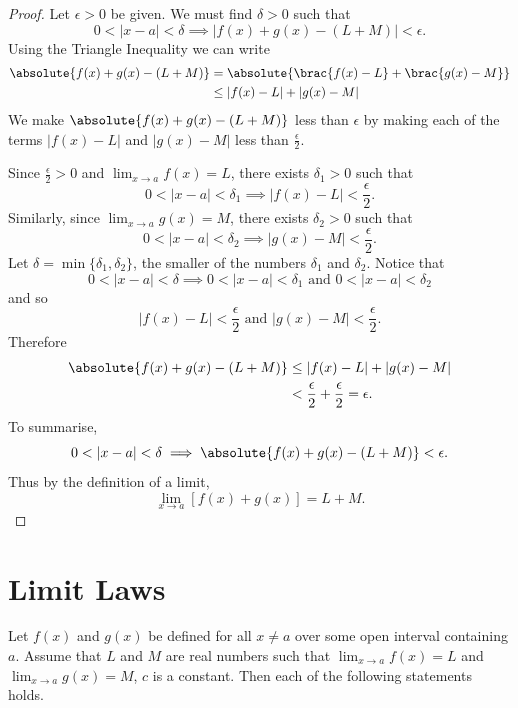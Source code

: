 \begin{proof}
Let $\epsilon>0$ be given. We must find $\delta>0$ such that
\[ 0<|x-a|<\delta \implies |f(x)+g(x)-(L+M)|<\epsilon. \]
Using the Triangle Inequality we can write
\begin{align*}
\absolute{f(x)+g(x)-(L+M)}&=\absolute{\brac{f(x)-L}+\brac{g(x)-M}}\\
&\le|f(x)-L|+|g(x)-M|
\end{align*}
We make $\absolute{f(x)+g(x)-(L+M)}$ less than $\epsilon$ by making each of the terms $|f(x)-L|$ and $|g(x)-M|$ less than $\frac{\epsilon}{2}$.

Since $\frac{\epsilon}{2}>0$ and $\lim_{x\to a}f(x)=L$, there exists $\delta_1>0$ such that
\[ 0<|x-a|<\delta_1 \implies |f(x)-L|<\frac{\epsilon}{2}. \]
Similarly, since $\lim_{x\to a}g(x)=M$, there exists $\delta_2>0$ such that
\[ 0<|x-a|<\delta_2 \implies |g(x)-M|<\frac{\epsilon}{2}. \]
Let $\delta=\min\{\delta_1,\delta_2\}$, the smaller of the numbers $\delta_1$ and $\delta_2$. Notice that
\[ 0<|x-a|<\delta \implies 0<|x-a|<\delta_1 \text{ and } 0<|x-a|<\delta_2 \]
and so
\[ |f(x)-L|<\frac{\epsilon}{2} \text{ and } |g(x)-M|<\frac{\epsilon}{2}. \]
Therefore
\begin{align*}
\absolute{f(x)+g(x)-(L+M)}&\le|f(x)-L|+|g(x)-M|\\
&<\frac{\epsilon}{2}+\frac{\epsilon}{2}=\epsilon.
\end{align*}
To summarise,
\[ 0<|x-a|<\delta \implies \absolute{f(x)+g(x)-(L+M)}<\epsilon. \]
Thus by the definition of a limit,
\[ \lim_{x\to a}[f(x)+g(x)]=L+M. \]
\end{proof}
\pagebreak

\section{Limit Laws}
Let $f(x)$ and $g(x)$ be defined for all $x\neq a$ over some open interval containing $a$. Assume that $L$ and $M$ are real numbers such that $\lim_{x\to a}f(x)=L$ and $\lim_{x\to a}g(x)=M$, $c$ is a constant. Then each of the following statements holds.

